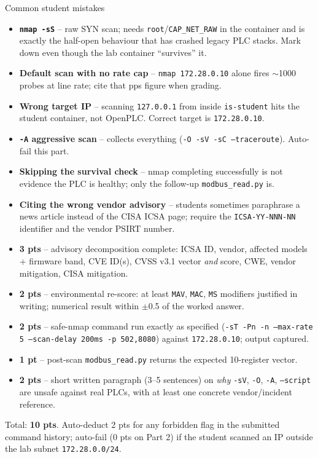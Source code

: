 \documentclass[11pt,a4paper]{article}
\begin{document}
\begin{solutionbox}{Common student mistakes}
\begin{itemize}[leftmargin=*, nosep]
  \item \textbf{\texttt{nmap -sS}} -- raw SYN scan; needs \texttt{root}/\texttt{CAP\_NET\_RAW} in the container and is exactly the half-open behaviour that has crashed legacy PLC stacks. Mark down even though the lab container ``survives'' it.
  \item \textbf{Default scan with no rate cap} -- \texttt{nmap 172.28.0.10} alone fires $\sim$1000 probes at line rate; cite that pps figure when grading.
  \item \textbf{Wrong target IP} -- scanning \texttt{127.0.0.1} from inside \texttt{is-student} hits the student container, not OpenPLC. Correct target is \texttt{172.28.0.10}.
  \item \textbf{\texttt{-A} aggressive scan} -- collects everything (\texttt{-O -sV -sC --traceroute}). Auto-fail this part.
  \item \textbf{Skipping the survival check} -- nmap completing successfully is not evidence the PLC is healthy; only the follow-up \texttt{modbus\_read.py} is.
  \item \textbf{Citing the wrong vendor advisory} -- students sometimes paraphrase a news article instead of the CISA ICSA page; require the \texttt{ICSA-YY-NNN-NN} identifier and the vendor PSIRT number.
\end{itemize}
\end{solutionbox}

\begin{rubricbox}
\begin{itemize}[leftmargin=*, nosep]
  \item \textbf{3 pts} -- advisory decomposition complete: ICSA ID, vendor, affected models + firmware band, CVE ID(s), CVSS v3.1 vector \emph{and} score, CWE, vendor mitigation, CISA mitigation.
  \item \textbf{2 pts} -- environmental re-score: at least \texttt{MAV}, \texttt{MAC}, \texttt{MS} modifiers justified in writing; numerical result within $\pm$0.5 of the worked answer.
  \item \textbf{2 pts} -- safe-nmap command run exactly as specified (\texttt{-sT -Pn -n --max-rate 5 --scan-delay 200ms -p 502,8080}) against \texttt{172.28.0.10}; output captured.
  \item \textbf{1 pt} -- post-scan \texttt{modbus\_read.py} returns the expected 10-register vector.
  \item \textbf{2 pts} -- short written paragraph (3--5 sentences) on \emph{why} \texttt{-sV}, \texttt{-O}, \texttt{-A}, \texttt{--script} are unsafe against real PLCs, with at least one concrete vendor/incident reference.
\end{itemize}
Total: \textbf{10 pts}. Auto-deduct 2 pts for any forbidden flag in the submitted command history; auto-fail (0 pts on Part 2) if the student scanned an IP outside the lab subnet \texttt{172.28.0.0/24}.
\end{rubricbox}
\end{document}
